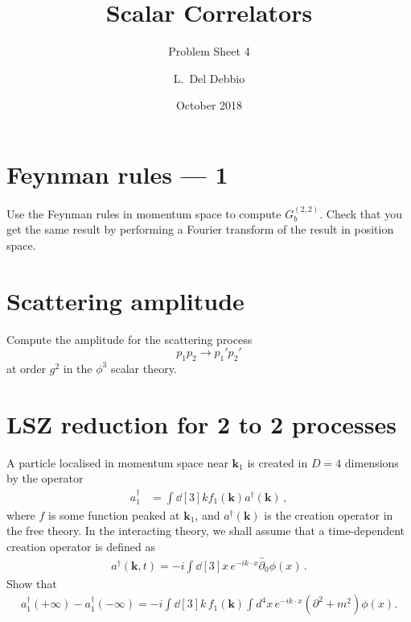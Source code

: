 \documentclass{tutorial}
\subtitle{Problem Sheet 4}
\title{Scalar Correlators}
\author{L.~Del Debbio}
\date{October 2018}
\begin{document}
\maketitle

\section{Feynman rules --- 1}

Use the Feynman rules in momentum space to compute
$G^{(2,2)}_b$. Check that you get the same result by performing a
Fourier transform of the result in position space.



\section{Scattering amplitude}

Compute the amplitude for the scattering process
\[
  p_1 p_2 \longrightarrow p_1' p_2'
\]
at order $g^2$ in the $\phi^3$ scalar theory.




\section{LSZ reduction for 2 to 2 processes}

A particle localised in momentum space near $\mathbf{k}_1$ is
created in $D=4$ dimensions by the operator
\begin{align}
  \label{eq:1}
  a_1^\dagger & = \int \dd[3]{k}  f_1(\mathbf{k}) a^\dagger(\mathbf{k})\, ,
\end{align}
where $f$ is some function peaked at $\mathbf{k}_1$, and
$a^\dagger(\mathbf{k})$ is the creation operator in the free
theory. In the interacting theory, we shall assume that a
time-dependent creation operator is defined as
\begin{align}
  \label{eq:2}
  a^\dagger(\mathbf{k},t) = -i \int \dd[3]{x}\, e^{-ik\cdot x}
  \overleftrightarrow{\partial_0} \phi(x)\, .
\end{align}
Show that
\begin{align}
  \label{eq:3}
  a_1^\dagger(+\infty) - a_1^\dagger(-\infty) =
  -i \int \dd[3]{k}\, f_1(\mathbf{k}) \int d^4x\,
  e^{-ik\cdot x} (\partial^2+m^2) \phi(x).
\end{align}
\end{document}
